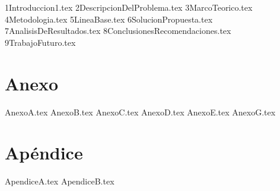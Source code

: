\documentclass[12pt,letterpaper,oneside]{book}
\newcommand{\capitulo}[1]{{#1.tex}}
\newcommand{\apendice}[1]{{#1.tex}}
\newcommand{\anexo}[1]{{#1.tex}}
\begin{document}
\frontmatter

\clearpage
\thispagestyle{empty}

\clearpage
\thispagestyle{empty}
\tableofcontents
\thispagestyle{empty}
\clearpage

\setcounter{page}{1}
\listoffigures
{}
\clearpage
\listoftables
{}
\clearpage

\mainmatter

\capitulo{1Introduccion1}
\capitulo{2DescripcionDelProblema}
\capitulo{3MarcoTeorico}
\capitulo{4Metodologia}
\capitulo{5LineaBase}
\capitulo{6SolucionPropuesta}
\capitulo{7AnalisisDeResultados}
\capitulo{8ConclusionesRecomendaciones}
\capitulo{9TrabajoFuturo}
\chapter*{Anexo}
\renewcommand{\thesection}{\Alph{section}}
\anexo{AnexoA}
\anexo{AnexoB}
\anexo{AnexoC}
\anexo{AnexoD}
\anexo{AnexoE}
\anexo{AnexoG}
\appendix
{}
\chapter*{Apéndice}
\apendice{ApendiceA}
\apendice{ApendiceB}
\backmatter


\end{document}

